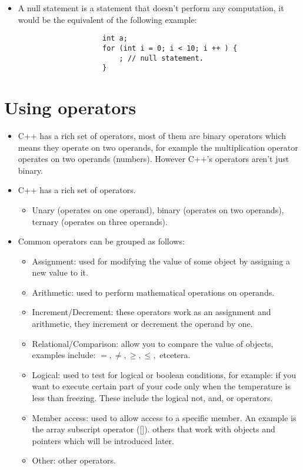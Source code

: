 \begin{itemize}
\begin{itemize}
            \item A null statement is a statement that doesn't perform any computation, it would be the equivalent of the following example: 
                \begin{verbatim}
                    int a;
                    for (int i = 0; i < 10; i ++ ) {
                        ; // null statement.
                    }
                \end{verbatim}
        \end{itemize}
\end{itemize}


\section{Using operators}
\begin{itemize}
    \item C++ has a rich set of operators, most of them are binary operators which means they operate on two operands, for example the multiplication operator operates on two operands (numbers). However C++'s operators aren't just binary.
    \item C++ has a rich set of operators.
        \begin{itemize}
            \item Unary (operates on one operand), binary (operates on two operands), ternary (operates on three operands).
        \end{itemize}
    
    \item Common operators can be grouped as follows:
        \begin{itemize}
            \item Assignment: used for modifying the value of some object by assigning a new value to it.
            \item Arithmetic: used to perform mathematical operations on operands.
            \item Increment/Decrement: these operators work as an assignment and arithmetic, they increment or decrement the operand by one.
            \item Relational/Comparison: allow you to compare the value of objects, examples include: $=, \neq, \geq, \leq, $ etcetera.
            \item Logical: used to test for logical or boolean conditions, for example: if you want to execute certain part of your code only when the temperature is less than freezing. These include the logical not, and, or operators.
            \item Member access: used to allow access to a specific member. An example is the array subscript operator ([]). others that work with objects and pointers which will be introduced later.
            \item Other: other operators.
        \end{itemize}
\end{itemize}


